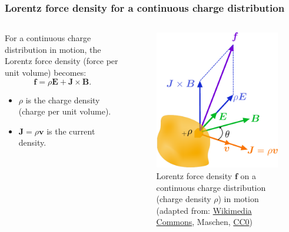 \begin{frame}
	\frametitle{Lorentz force density for a continuous charge distribution}
    \begin{columns}
		\begin{column}{0.5\textwidth}
         For a continuous charge distribution in motion, the Lorentz force density (force per unit volume) becomes: 
            \begin{equation}
                \bm{f} = \rho\bm{E} + \bm{J}\times\bm{B}.
            \end{equation}
            \begin{itemize}
                \item $\rho$ is the charge density (charge per unit volume).
                \item $\bm{J} = \rho \bm{v}$ is the current density.
            \end{itemize}
		\end{column}
        \hfill
		\begin{column}{0.5\textwidth}
			\begin{figure}
				\centering
				\includegraphics[height=0.6\textheight]{fig/lec02/Lorentz_force_continuum.pdf}
				\caption{Lorentz force density $\bm{f}$ on a continuous charge distribution (charge density $\rho$) in motion (adapted from: \href{https://commons.wikimedia.org/wiki/File:Lorentz_force_continuum.svg}{Wikimedia Commons}, Maschen, \href{https://creativecommons.org/publicdomain/zero/1.0/deed.en}{CC0})}
			\end{figure}
		\end{column}
		\end{columns}
\end{frame}

